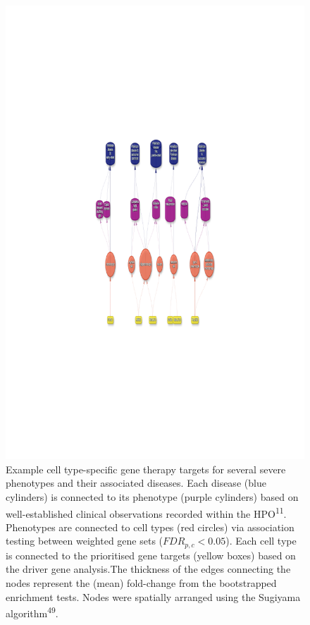 \documentclass[
sn-nature
]{sn-jnl}
\begin{document}
\begin{figure}
\begin{minipage}{\linewidth}
{\includegraphics{index_files/figure-pdf/fig-therapy-examples-4.pdf}

}


\end{minipage}%

\caption{\label{fig-therapy-examples}Example cell type-specific gene
therapy targets for several severe phenotypes and their associated
diseases. Each disease (blue cylinders) is connected to its phenotype
(purple cylinders) based on well-established clinical observations
recorded within the HPO\textsuperscript{11}. Phenotypes are connected to
cell types (red circles) via association testing between weighted gene
sets (\(FDR_{p,c}<0.05\)). Each cell type is connected to the
prioritised gene targets (yellow boxes) based on the driver gene
analysis.The thickness of the edges connecting the nodes represent the
(mean) fold-change from the bootstrapped enrichment tests. Nodes were
spatially arranged using the Sugiyama algorithm\textsuperscript{49}.}

\end{figure}%
\end{document}
